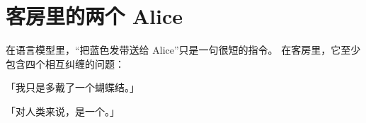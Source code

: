 

\begin{abstract}
具身智能要把图像与语言的理解落实到一个真实身体上。这个身体有质量和惯性，会受遮挡、摩擦与控制延迟影响，也会在动作执行期间遇到新的变化。
世界模型为它提供可预测的内部环境：给定当前观测与候选动作，估计接下来可能出现的状态、风险和结果；视觉--语言--动作模型（VLA）则把视觉观测、语言意图和机器人状态压到统一接口，生成能够落到关节或底盘上的动作。
前者主要回答“这样做以后会怎样”，后者主要回答“现在该怎样做”，二者在规划、执行与反馈重规划中互补。
本章沿着千奈家客房里的三次失灵展开：机器人不会预判脚凳与地毯带来的后果，需要世界模型；听见“送给 Alice”却不能把指令稳妥地落到身体上，需要 VLA；仿真中可行的策略遇到移动家具、厚地毯和新服装便失效，需要 sim2real。技术部分依次介绍 Dyna、MPC、PlaNet、Dreamer 与预测式视频表征，梳理 SayCan、RT 系列、OpenVLA 和 $\pi$ 系列，并以 $\pi_{0.7}$ 说明世界模型生成的视觉子目标如何参与 VLA 执行。
\end{abstract}

\section{客房里的两个 Alice}

在语言模型里，“把蓝色发带送给 Alice”只是一句很短的指令。
在客房里，它至少包含四个相互纠缠的问题：


「我只是多戴了一个蝴蝶结。」

「对人类来说，是一个。」

